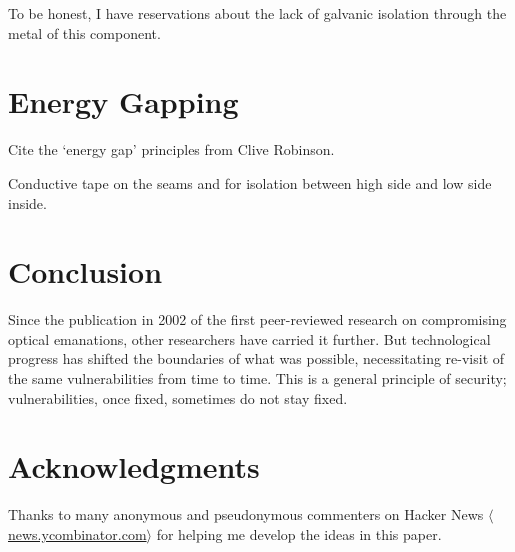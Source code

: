 \documentclass[conference]{IEEEtran}
\newcommand{\URL}[1]{$\langle$\url{#1}$\rangle$}
\begin{document}
To be honest, I have reservations about the lack of galvanic isolation
through the metal of this component.

\section{Energy Gapping}

Cite the `energy gap' principles from Clive Robinson.

Conductive tape on the seams and for isolation between high side and low side
inside.

\section{Conclusion}

Since the publication in 2002 of the first peer-reviewed research on
compromising optical emanations, other researchers have carried it further.
But technological progress has shifted the boundaries of what was possible,
necessitating re-visit of the same vulnerabilities from time to time. This is
a general principle of security; vulnerabilities, once fixed, sometimes do
not stay fixed.

\section*{Acknowledgments}

Thanks to many anonymous and pseudonymous commenters on Hacker News
\URL{news.ycombinator.com} for helping me develop the ideas in this paper.




\end{document}
